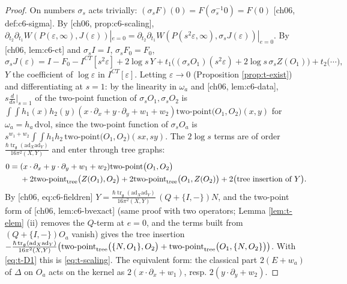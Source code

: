\documentclass[11pt]{report}
\theoremstyle{plain}
\theoremstyle{definition}
\numberwithin{equation}{chapter}
\newcommand{\unit}{\tfrac{\hbar\operatorname{tr}_{\mathfrak g}(\mathrm{ad}_X\mathrm{ad}_Y)}{16\pi^2(X,Y)}}
\newcommand{\TP}[2]{\mathrm{two\mbox{-}point}\big(#1,#2\big)}
\newcommand{\TPz}[2]{\mathrm{two\mbox{-}point}_{\rm tree}\big(#1,#2\big)}
\begin{document}
\begin{proof}
On numbers $\sigma_s$ acts trivially: $(\sigma_sF)(0)=F(\sigma_s^{-1}0)=F(0)$ [ch06, def:c6-sigma]. By [ch06, prop:c6-scaling], $\partial_{t_2}\partial_{t_1}W(P(\varepsilon,\infty),J(\varepsilon))|_{e=0}=\partial_{t_2}\partial_{t_1}W(P(s^2\varepsilon,\infty),\sigma_sJ(\varepsilon))|_{e=0}$. By [ch06, lem:c6-ct] and $\sigma_sI=I$, $\sigma_sF_0=F_0$,
\[
\sigma_sJ(\varepsilon)=I-F_0-I^{CT}[s^2\varepsilon]+2\log s\,Y+t_1\big((\sigma_sO_1)(s^2\varepsilon)+2\log s\,\sigma_sZ(O_1)\big)+t_2\big(\cdots\big),
\]
$Y$ the coefficient of $\log\varepsilon$ in $I^{CT}[\varepsilon]$. Letting $\varepsilon\to0$ (Proposition \ref{prop:t-exist}) and differentiating at $s=1$: by the linearity in $\omega_a$ and [ch06, lem:c6-data], $s\frac{d}{ds}|_{s=1}$ of the two-point function of $\sigma_sO_1,\sigma_sO_2$ is $\int\!\!\int h_1(x)h_2(y)(x\cdot\partial_x+y\cdot\partial_y+w_1+w_2)\TP{O_1}{O_2}(x,y)$ for $\omega_a=h_a\,\mathrm{dvol}$, since the two-point function of $\sigma_sO_a$ is $s^{w_1+w_2}\int\!\!\int h_1h_2\,\TP{O_1}{O_2}(sx,sy)$. The $2\log s$ terms are of order $\unit$ and enter through tree graphs:
\[
\begin{aligned}
0={}&(x\cdot\partial_x+y\cdot\partial_y+w_1+w_2)\TP{O_1}{O_2}\\
&+2\TPz{Z(O_1)}{O_2}+2\TPz{O_1}{Z(O_2)}+2\big(\text{tree insertion of }Y\big).
\end{aligned}
\]
By [ch06, eq:c6-fieldren] $Y=\unit\,(Q+\{I,-\})N$, and the two-point form of [ch06, lem:c6-bvexact] (same proof with two operators; Lemma \ref{lem:t-elem} (ii) removes the $Q$-term at $e=0$, and the terms built from $(Q+\{I,-\})O_a$ vanish) gives the tree insertion $-\unit\big(\TPz{\{N,O_1\}}{O_2}+\TPz{O_1}{\{N,O_2\}}\big)$. With \eqref{eq:t-D1} this is \eqref{eq:t-scaling}. The equivalent form: the classical part $2(E+w_a)$ of $\Delta$ on $O_a$ acts on the kernel as $2(x\cdot\partial_x+w_1)$, resp. $2(y\cdot\partial_y+w_2)$.
\end{proof}
\end{document}
